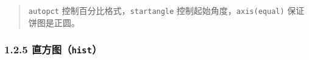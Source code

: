 \begin{Shaded}
\begin{Highlighting}[]

\OperatorTok{=} \NormalTok{, }\NormalTok{, }\NormalTok{, }
\OperatorTok{=}\NormalTok{ [}\NormalTok{, }\NormalTok{, }\NormalTok{, }\NormalTok{]}
\OperatorTok{=}\OperatorTok{=}\StringTok{\textquotesingle{}}\StringTok{\textquotesingle{}}\OperatorTok{=}\NormalTok{)}
\NormalTok{)}
\NormalTok{)}
\NormalTok{(}\NormalTok{, }
\end{Highlighting}
\end{Shaded}

\begin{Shaded}
\begin{Highlighting}[]
\end{Highlighting}
\end{Shaded}

\begin{quote}
\texttt{autopct} 控制百分比格式，\texttt{startangle}
控制起始角度，\texttt{axis(\textquotesingle{}equal\textquotesingle{})}
保证饼图是正圆。
\end{quote}

\subsubsection{\texorpdfstring{1.2.5
直方图（\texttt{hist}）}{1.2.5 直方图（hist）}}\label{ux76f4ux65b9ux56fehist}

